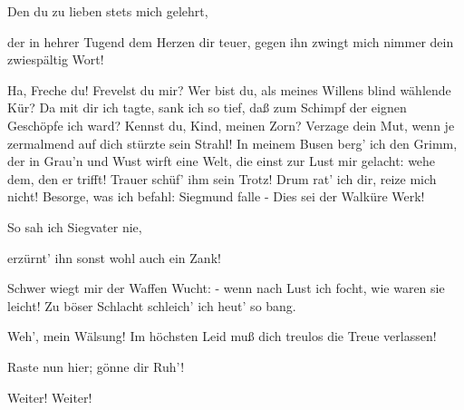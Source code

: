 \begin{drama}
\Brunnhildespeaks
Den du zu lieben stets mich gelehrt,


der in hehrer Tugend dem Herzen dir teuer,
gegen ihn zwingt mich nimmer dein zwiespältig Wort!
 

\Wotanspeaks
Ha, Freche du! Frevelst du mir?
Wer bist du, als meines Willens
blind wählende Kür?
Da mit dir ich tagte, sank ich so tief,
daß zum Schimpf der eignen
Geschöpfe ich ward?
Kennst du, Kind, meinen Zorn?
Verzage dein Mut,
wenn je zermalmend
auf dich stürzte sein Strahl!
In meinem Busen berg' ich den Grimm,
der in Grau'n und Wust wirft eine Welt,
die einst zur Lust mir gelacht:
wehe dem, den er trifft!
Trauer schüf' ihm sein Trotz!
Drum rat' ich dir, reize mich nicht!
Besorge, was ich befahl:
Siegmund falle -
Dies sei der Walküre Werk!
 




\Brunnhildespeaks


So sah ich Siegvater nie,


erzürnt' ihn sonst wohl auch ein Zank!


Schwer wiegt mir der Waffen Wucht: -
wenn nach Lust ich focht,
wie waren sie leicht!
Zu böser Schlacht schleich' ich heut' so bang.


Weh', mein Wälsung!
Im höchsten Leid
muß dich treulos die Treue verlassen!


\scene



\Siegmundspeaks
Raste nun hier; gönne dir Ruh'!

\Sieglindespeaks
Weiter! Weiter!
 


\end{drama}
